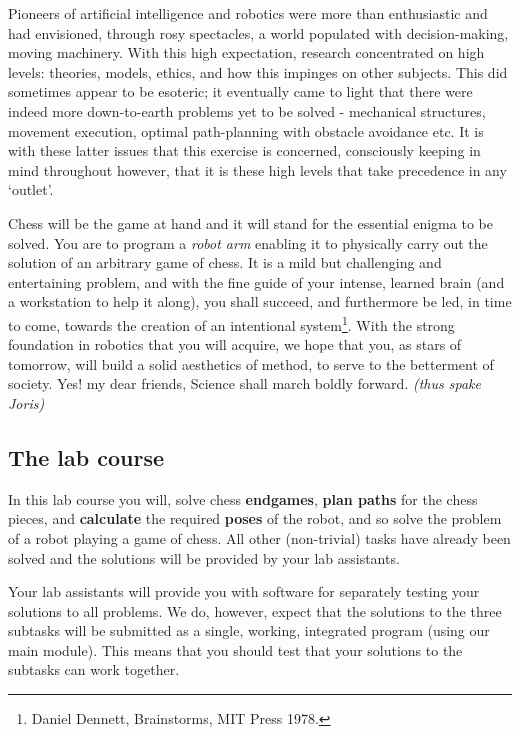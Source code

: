 \documentclass[10pt]{scrartcl}
\begin{document}
Pioneers of artificial intelligence and robotics were more than
enthusiastic and had envisioned, through rosy spectacles, a world
populated with decision-making, moving machinery. With this high
expectation, research concentrated on high levels: theories, models,
ethics, and how this impinges on other subjects. This did sometimes
appear to be esoteric; it eventually came to light that there were
indeed more down-to-earth problems yet to be solved - mechanical
structures, movement execution, optimal path-planning with obstacle
avoidance etc. It is with these latter issues that this exercise is
concerned, consciously keeping in mind throughout however, that it is
these high levels that take precedence in any `outlet'.

Chess will be the game at hand and it will stand for the essential
enigma to be solved. You are to program a {\em robot arm} enabling it to
physically carry out the solution of an arbitrary game of chess. It is a
mild but challenging and entertaining problem, and with the fine guide
of your intense, learned brain (and a workstation to help it along), you
shall succeed, and furthermore be led, in time to come, towards the
creation of an intentional system\footnote{Daniel Dennett, Brainstorms,
MIT Press 1978.}. With the strong foundation in robotics that you will
acquire, we hope that you, as stars of tomorrow, will build a solid
aesthetics of method, to serve to the betterment of society. Yes! my
dear friends, Science shall march boldly forward. 
\hfill {\em (thus spake Joris)}

\subsection{The lab course}

In this lab course you will, solve chess {\bfseries endgames},
{\bfseries plan paths} for the chess pieces, and {\bfseries calculate}
the required {\bfseries poses} of the robot, and so solve the problem of
a robot playing a game of chess. All other (non-trivial) tasks have
already been solved and the solutions will be provided by your lab assistants.


Your lab assistants will provide you with software for
separately testing your solutions to all problems. We do, however,
expect that the solutions to the three subtasks will be submitted as a
single, working, integrated program (using our main module). This means
that you should test that your solutions to the subtasks can work
together.
\end{document}
